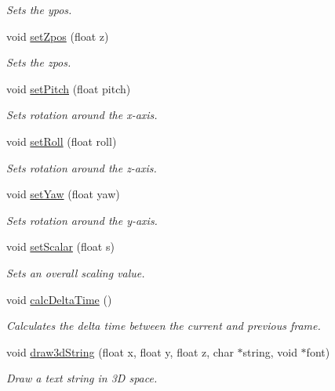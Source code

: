 \begin{DoxyCompactItemize}
\begin{DoxyCompactList}\small\item\em Sets the ypos. \end{DoxyCompactList}\item 
void \hyperlink{class_drawable_object_a7f497ef5c59dc1a0571db3dfdddbc1d0}{set\-Zpos} (float z)
\begin{DoxyCompactList}\small\item\em Sets the zpos. \end{DoxyCompactList}\item 
void \hyperlink{class_drawable_object_aae7de96ff22d974407e4b0a35ac0bc63}{set\-Pitch} (float pitch)
\begin{DoxyCompactList}\small\item\em Sets rotation around the x-\/axis. \end{DoxyCompactList}\item 
void \hyperlink{class_drawable_object_a865185a81729e9f99002d1f2a958e3bb}{set\-Roll} (float roll)
\begin{DoxyCompactList}\small\item\em Sets rotation around the z-\/axis. \end{DoxyCompactList}\item 
void \hyperlink{class_drawable_object_a89cc4bb15a2376c76acb0a21e32ef5e3}{set\-Yaw} (float yaw)
\begin{DoxyCompactList}\small\item\em Sets rotation around the y-\/axis. \end{DoxyCompactList}\item 
void \hyperlink{class_drawable_object_ac54bd0b8b8e424809302388c70c82288}{set\-Scalar} (float s)
\begin{DoxyCompactList}\small\item\em Sets an overall scaling value. \end{DoxyCompactList}\item 
void \hyperlink{class_drawable_object_a1d94a668dc3b2cd7e8b43e9a7b4e4fde}{calc\-Delta\-Time} ()
\begin{DoxyCompactList}\small\item\em Calculates the delta time between the current and previous frame. \end{DoxyCompactList}\item 
void \hyperlink{class_drawable_object_a2b6935b2330fa1bc4fe7e41feda47b2d}{draw3d\-String} (float x, float y, float z, char $\ast$string, void $\ast$font)
\begin{DoxyCompactList}\small\item\em Draw a text string in 3\-D space. \end{DoxyCompactList}\item 

\end{DoxyCompactItemize}
